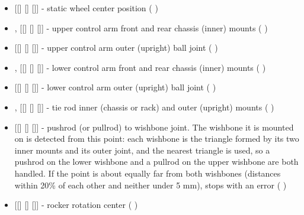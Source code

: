 \begin{itemize}
    \item {} [[] [] []] - static wheel center position (  )

    \item {},  [[] [] []] - upper control arm front and rear chassis (inner) mounts (  )

    \item {} [[] [] []] - upper control arm outer (upright) ball joint (  )

    \item {},  [[] [] []] - lower control arm front and rear chassis (inner) mounts (  )

    \item {} [[] [] []] - lower control arm outer (upright) ball joint (  )

    \item {},  [[] [] []] - tie rod inner (chassis or rack) and outer (upright) mounts (  )

    \item {} [[] [] []] - pushrod (or pullrod) to wishbone joint. The wishbone it is mounted on is detected from this point: each wishbone is the triangle formed by its two inner mounts and its outer joint, and the nearest triangle is used, so a pushrod on the lower wishbone and a pullrod on the upper wishbone are both handled. If the point is about equally far from both wishbones (distances within 20\% of each other and neither under 5 mm),  stops with an error (  )

    \item {} [[] [] []] - rocker rotation center (  )


\end{itemize}
